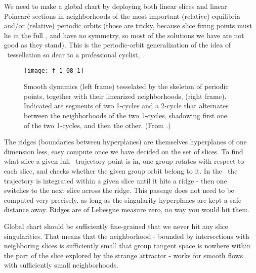 We need to make a global chart by deploying both linear slices and linear
Poincar\'e sections in neighborhoods of the most important (relative)
equilibria and/or (relative) periodic orbits (those are tricky, because
slice fixing points must lie in the full \statesp, and have no symmetry,
so most of the solutions we have are not good as they stand). This is the
periodic-orbit generalization of the idea of
{\statesp\ tessellation}
so dear to a professional cyclist, .

 \begin{figure}
 \texttt{[image: f\_1\_08\_1]}
 \caption{\label{fig:Tesselate}
Smooth dynamics  (left frame) tesselated by the skeleton of
periodic points, together with their linearized neighborhoods,
(right frame).
Indicated are segments of two 1-cycles and a 2-cycle that
alternates between the neighborhoods of the two 1-cycles,
shadowing first one of the two 1-cycles, and then the other.
(From \wwwcb{}.)
  }\end{figure}
%


The ridges (boundaries
between hyperplanes) are themselves hyperplanes of one dimension less,
easy compute once we have decided on the set of slices. To find
what slice a given full \statesp\ trajectory point is in, one group-rotates
with respect to each slice, and checks whether the given group orbit
belong to it. In the \reducedsp\ the trajectory is integrated within a
given slice until it hits a ridge - then one switches to
the next slice across the ridge. This passage does not need to
be computed very precisely, as long as the singularity
hyperplanes are kept a safe distance away. Ridges are of Lebesgue
measure zero, no
way you would hit them.

Global chart should be sufficiently fine-grained that we never hit any
slice singularities. That means that the neighborhood - bounded by
intersections with neighboring slices is sufficiently small that group
tangent space is nowhere within the part of the slice explored by
the strange attractor - works for smooth flows
with sufficiently small neighborhoods.

